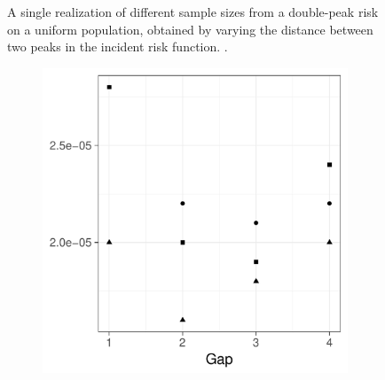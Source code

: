 \begin{figure}[htbp]
\begin{subfigure}{0.45\textwidth}
        \label{fig:one_sample:p1.4_100_G:4}
    \end{subfigure}
    \caption[Examples showing distance between two peaks]
        {A single realization of different sample sizes from a double-peak risk on a uniform population, obtained by varying the distance between two peaks in the incident risk function. \scatterplotcaption.}
    \label{fig:one_sample:p1.4_100_G}
\end{figure}


\begin{figure}[htbp]
    \centering
    \begin{subfigure}[b]{0.49\textwidth}
        \includegraphics[width=\textwidth]{results/by_two_peaks/MISE-vs-risk-peak-gap}
        \caption{}
    \end{subfigure}


\end{figure}
